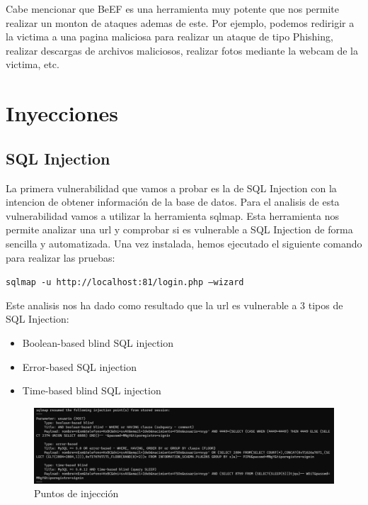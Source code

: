 \documentclass{report}
\begin{document}
                Cabe mencionar que BeEF es una herramienta muy potente que nos permite realizar un monton de ataques ademas de este.
                Por ejemplo, podemos redirigir a la victima a una pagina maliciosa para realizar un ataque de tipo Phishing,
                realizar descargas de archivos maliciosos,
                realizar fotos mediante la webcam de la victima,
                etc.
                \clearpage
        \section{Inyecciones}
            \subsection{SQL Injection}
                La primera vulnerabilidad que vamos a probar es la de SQL Injection con la intencion de obtener información de la base de datos.
                Para el analisis de esta vulnerabilidad vamos a utilizar la herramienta sqlmap. 
                Esta herramienta nos permite analizar una url y comprobar si es vulnerable a SQL Injection de forma sencilla y automatizada.
                Una vez instalada, hemos ejecutado el siguiente comando para realizar las pruebas:\\
                \begin{center}
                    \texttt{sqlmap -u http://localhost:81/login.php --wizard}
                \end{center}
                Este analisis nos ha dado como resultado que la url es vulnerable a 3 tipos de SQL Injection:
                \begin{itemize}
                    \item Boolean-based blind SQL injection
                    \item Error-based SQL injection
                    \item Time-based blind SQL injection
                \end{itemize}
                \begin{figure}[H]
                    \centering
                    \includegraphics[width=1\textwidth]{./img/vulnerabilidades/2.3/1.1.png}
                    \caption{Puntos de injección}
                \end{figure}
\end{document}
